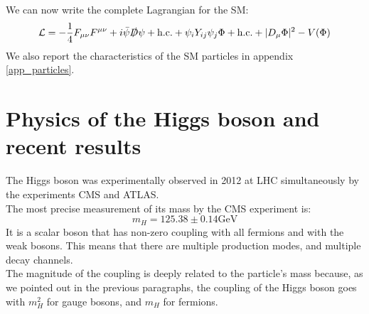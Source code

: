 We can now write the complete Lagrangian for the SM:
\begin{equation}
    \mathcal{L} = -\frac{1}{4}F_{\mu\nu}F^{\mu\nu} + i\bar{\psi}\slashed{D}\psi +\text{h.c.} + \psi_i Y_{ij}\psi_j \Phi  +\text{h.c.} + |D_{\mu}\Phi|^2 -V(\Phi)
\end{equation}
We also report the characteristics of the SM particles in appendix \ref{app_particles}.

\section{Physics of the Higgs boson and recent results}
The Higgs boson was experimentally observed in 2012 at LHC simultaneously by the experiments CMS and ATLAS.\\
The most precise measurement of its mass by the CMS experiment \cite{art_nature_cms} is:
\begin{equation}
    m_H = 125.38 \pm 0.14 \text{GeV} 
\end{equation}
It is a scalar boson that has non-zero coupling with all fermions and with the weak bosons.
This means that there are multiple production modes, and multiple decay channels.\\
The magnitude of the coupling is deeply related to the particle's mass because, as we pointed out in the previous paragraphs, the coupling of the Higgs boson goes with $m_H^2$ for gauge bosons, and $m_H$ for fermions.
